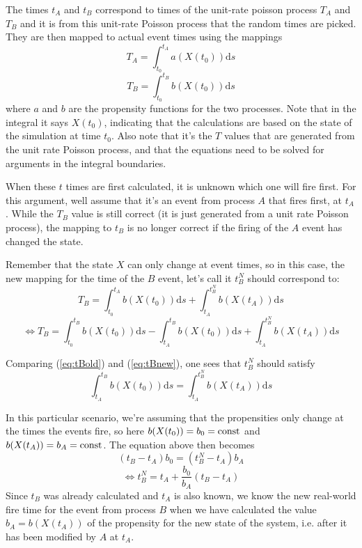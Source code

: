 \documentclass[a4paper,11pt]{article}
\newcommand{\ud}{\mathrm{d}}
\begin{document}
		The times $t_A$ and $t_B$ correspond to times of the unit-rate poisson process $T_A$ 
		and $T_B$ and it is from this unit-rate Poisson process that the random times are picked. They
		are then mapped to actual event times using the mappings
		\[ T_A = \int_{t_0}^{t_A} a(X(t_0)) \ud s \]
		\begin{equation}
			T_B = \int_{t_0}^{t_B} b(X(t_0)) \ud s
			\label{eq:tBold}
		\end{equation}
		where $a$ and $b$ are the propensity functions for the two processes. Note that in the integral
		it says $X(t_0)$, indicating that the calculations are based on the state of the simulation at time
		$t_0$. Also note that it's the $T$ values that are generated from the unit rate Poisson process,
		and that the equations need to be solved for arguments in the integral boundaries.

		When these $t$ times are first calculated, it is unknown which one will fire first. For this argument,
		well assume that it's an event from process $A$ that fires first, at $t_A$. While the $T_B$
		value is still correct (it is just generated from a unit rate Poisson process), the mapping to $t_B$
		is no longer correct if the firing of the $A$ event has changed the state.

		Remember that the state $X$ can only change at event times, so in this case, the new mapping for the
		time of the $B$ event, let's call it $t_B^N$ should correspond to:
		\begin{equation}
			T_B = \int_{t_0}^{t_A} b(X(t_0)) \ud s + \int_{t_A}^{t_B^N} b(X(t_A)) \ud s
			\label{eq:TBsplit}
		\end{equation}
		\begin{equation}
			\Leftrightarrow T_B = \int_{t_0}^{t_B} b(X(t_0)) \ud s - \int_{t_A}^{t_B} b(X(t_0)) \ud s
		                             + \int_{t_A}^{t_B^N} b(X(t_A)) \ud s
			\label{eq:tBnew}
		\end{equation}

		Comparing (\ref{eq:tBold}) and (\ref{eq:tBnew}), one sees that $t_B^N$ should satisfy
		\begin{equation}
			\int_{t_A}^{t_B} b(X(t_0)) \ud s = \int_{t_A}^{t_B^N} b(X(t_A)) \ud s
		\end{equation}

		In this particular scenario, we're assuming that the propensities only change at the times the events
		fire, so here $b(X(t_0)) = b_0 = \rm{const}$ and $b(X(t_A)) = b_A = \rm{const}$. The equation above
		then becomes
		\begin{equation}
			(t_B-t_A) b_0 = (t_B^N-t_A) b_A
			\label{eq:internaltimes}
		\end{equation}
		\[ \Leftrightarrow t_B^N = t_A + \frac{b_0}{b_A}(t_B-t_A) \]
		Since $t_B$ was already calculated and $t_A$ is also known, we know the new real-world fire time for
		the event from process $B$ when we have calculated the value $b_A = b(X(t_A)) $ of the propensity for 
		the new state of the system, i.e. after it has been modified by $A$ at $t_A$.
		
\end{document}
